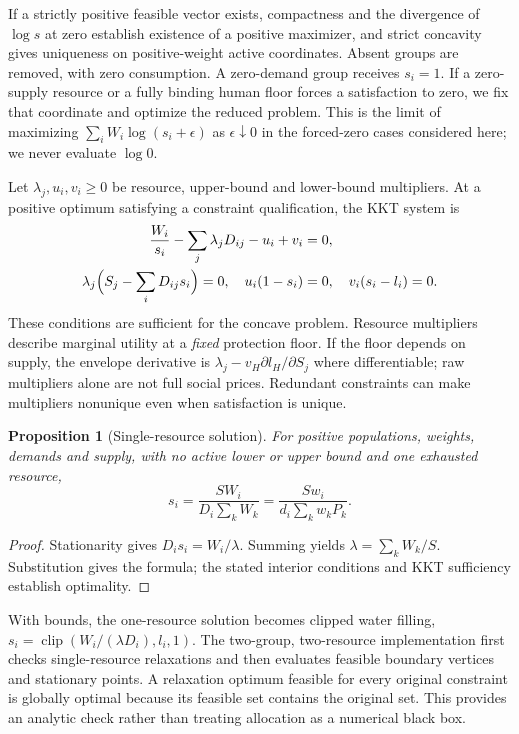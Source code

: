 \documentclass[12pt,a4paper]{article}
\newtheorem{proposition}{Proposition}[section]
\theoremstyle{remark}
\begin{document}
If a strictly positive feasible vector exists, compactness and the divergence of $\log s$ at zero establish existence of a positive maximizer, and strict concavity gives uniqueness on positive-weight active coordinates. Absent groups are removed, with zero consumption. A zero-demand group receives $s_i=1$. If a zero-supply resource or a fully binding human floor forces a satisfaction to zero, we fix that coordinate and optimize the reduced problem. This is the limit of maximizing $\sum_iW_i\log(s_i+\epsilon)$ as $\epsilon\downarrow0$ in the forced-zero cases considered here; we never evaluate $\log0$.

Let $\lambda_j,u_i,v_i\ge0$ be resource, upper-bound and lower-bound multipliers. At a positive optimum satisfying a constraint qualification, the KKT system is
\begin{align}
\frac{W_i}{s_i}-\sum_j\lambda_jD_{ij}-u_i+v_i&=0,\label{eq:kkt}\\
\lambda_j\Bigl(S_j-\sum_iD_{ij}s_i\Bigr)=0,\quad
u_i(1-s_i)&=0,\quad v_i(s_i-l_i)=0.\nonumber
\end{align}
These conditions are sufficient for the concave problem. Resource multipliers describe marginal utility at a \emph{fixed} protection floor. If the floor depends on supply, the envelope derivative is $\lambda_j-v_H\partial l_H/\partial S_j$ where differentiable; raw multipliers alone are not full social prices. Redundant constraints can make multipliers nonunique even when satisfaction is unique.

\begin{proposition}[Single-resource solution]\label{prop:single}
For positive populations, weights, demands and supply, with no active lower or upper bound and one exhausted resource,
\begin{equation}\label{eq:single}
s_i=\frac{SW_i}{D_i\sum_kW_k}
=\frac{Sw_i}{d_i\sum_kw_kP_k}.
\end{equation}
\end{proposition}
\begin{proof}
Stationarity gives $D_is_i=W_i/\lambda$. Summing yields $\lambda=\sum_kW_k/S$. Substitution gives the formula; the stated interior conditions and KKT sufficiency establish optimality.
\end{proof}
With bounds, the one-resource solution becomes clipped water filling, $s_i=\operatorname{clip}(W_i/(\lambda D_i),l_i,1)$. The two-group, two-resource implementation first checks single-resource relaxations and then evaluates feasible boundary vertices and stationary points. A relaxation optimum feasible for every original constraint is globally optimal because its feasible set contains the original set. This provides an analytic check rather than treating allocation as a numerical black box.
\end{document}
